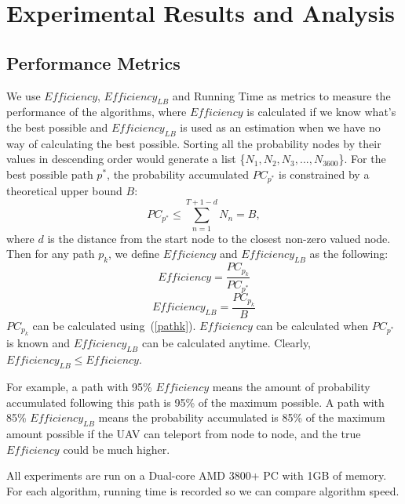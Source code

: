 \section{Experimental Results and Analysis}

\subsection{Performance Metrics}

We use $\mathit{Efficiency}$, $\mathit{Efficiency_{LB}}$ and Running Time as metrics to measure the performance of the algorithms, where $\mathit{Efficiency}$ is calculated if we know what's the best possible and $\mathit{Efficiency_{LB}}$ is used as an estimation when we have no way of calculating the best possible. Sorting all the probability nodes by their values in descending order would generate a list \{$N_1, N_2, N_3, ..., N_{3600}$\}. For the best possible path $p^*$, the probability accumulated $PC_{p^*}$ is constrained by a theoretical upper bound $B$:
\begin{equation}
PC_{p^*} \leq \sum_{n=1}^{T+1-d}N_n = B,
\label{topN}
\end{equation}
where $d$ is the distance from the start node to the closest non-zero valued node. Then for any path $p_k$, we define $\mathit{Efficiency}$ and $\mathit{Efficiency_{LB}}$ as the following:
\begin{equation}
\mathit{Efficiency} = \frac{PC_{p_k}}{PC_{p^*}}
\label{4Efficiency}
\end{equation}
\begin{equation}
\mathit{Efficiency_{LB}} = \frac{PC_{p_k}}{B}
\label{4EfficiencyLB}
\end{equation}
$PC_{p_k}$ can be calculated using~(\ref{pathk}). $\mathit{Efficiency}$ can be calculated when $PC_{p^*}$ is known and $\mathit{Efficiency_{LB}}$ can be calculated anytime. Clearly, $\mathit{Efficiency_{LB}} \leq \mathit{Efficiency}$.

For example, a path with 95\% $\mathit{Efficiency}$ means the amount of probability accumulated following this path is 95\% of the maximum possible. A path with 85\% $\mathit{Efficiency_{LB}}$ means the probability accumulated is 85\% of the maximum amount possible if the UAV can teleport from node to node, and the true $\mathit{Efficiency}$ could be much higher.

All experiments are run on a Dual-core AMD 3800+ PC with 1GB of memory. For each algorithm, running time is recorded so we can compare algorithm speed.


